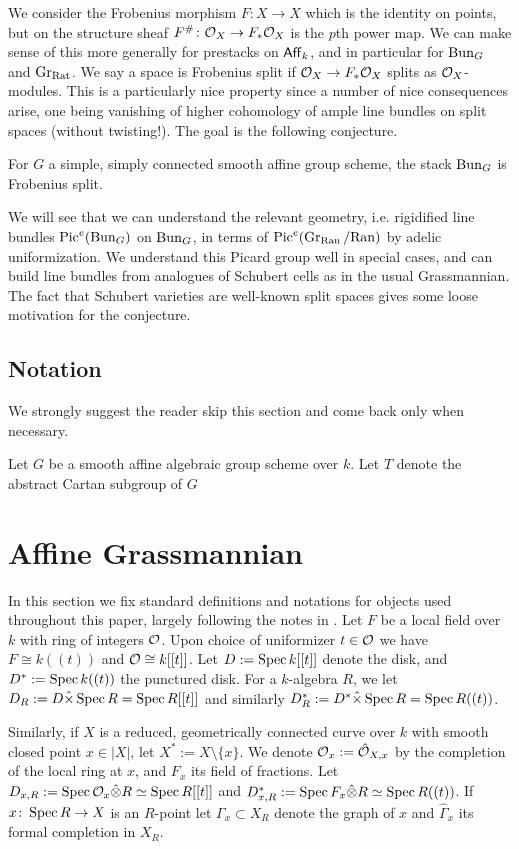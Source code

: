 \documentclass[12pt]{article}
\begin{document}
We consider the Frobenius morphism $F \colon X \to X$ which is the identity on points, but on the structure sheaf $F^{\#}\colon \mathcal{O}_X \to F_* \mathcal{O}_X$ is the $p$th power map. We can make sense of this more generally for prestacks on $\operatorname{\mathsf{Aff}}_k$, and in particular for $\operatorname{Bun}_G$ and $\operatorname{Gr}_{\mathrm{Rat}}$. We say a space is Frobenius split if $\mathcal{O}_X \to F_* \mathcal{O}_X$ splits as $\mathcal{O}_X$-modules. This is a particularly nice property since a number of nice consequences arise, one being vanishing of higher cohomology of ample line bundles on split spaces (without twisting!). The goal is the following conjecture.
\begin{conj}
    For $G$ a simple, simply connected smooth affine group scheme, the stack $\operatorname{Bun}_G$ is Frobenius split.
\end{conj}
We will see that we can understand the relevant geometry, i.e. rigidified line bundles $\operatorname{Pic}^e(\operatorname{Bun}_G)$ on $\operatorname{Bun}_G$, in terms of $\operatorname{Pic}^e(\operatorname{Gr}_{\mathrm{Ran}}/\mathrm{Ran})$ by adelic uniformization. We understand this Picard group well in special cases, and can build line bundles from analogues of Schubert cells as in the usual Grassmannian. The fact that Schubert varieties are well-known split spaces gives some loose motivation for the conjecture.

\subsection{Notation}

We strongly suggest the reader skip this section and come back only when necessary.

Let $G$ be a smooth affine algebraic group scheme over $k$. Let $T$ denote the abstract Cartan subgroup of $G$



\section{Affine Grassmannian}
In this section we fix standard definitions and notations for objects used throughout this paper, largely following the notes in \cite{zhu}. Let $F$ be a local field over $k$ with ring of integers $\mathcal{O}$. Upon choice of uniformizer $t \in \mathcal{O}$ we have $F \cong k((t))$ and $\mathcal{O} \cong k[[t]]$. Let $D := \operatorname{Spec} k[[t]]$ denote the disk, and $D^* := \operatorname{Spec} k((t))$ the punctured disk. For a $k$-algebra $R$, we let $D_R := D \hat{\times} \operatorname{Spec} R = \operatorname{Spec} R[[t]]$ and similarly $D^*_R := D^* \hat{\times} \operatorname{Spec} R = \operatorname{Spec} R((t))$. 

Similarly, if $X$ is a reduced, geometrically connected curve over $k$ with smooth closed point $x \in |X|$, let $X^* := X \setminus \{x\}$. We denote $\mathcal{O}_x := \hat{\mathcal{O}}_{X,x}$ by the completion of the local ring at $x$, and $F_x$ its field of fractions. Let $D_{x,R} := \operatorname{Spec} \mathcal{O}_x \hat{\otimes} R \simeq \operatorname{Spec} R[[t]]$ and $D_{x,R}^* := \operatorname{Spec} F_x \hat{\otimes} R \simeq \operatorname{Spec} R((t))$. If $x \colon \operatorname{Spec} R \to X$ is an $R$-point let $\Gamma_x \subset X_R$ denote the graph of $x$ and $\hat{\Gamma}_x$ its formal completion in $X_R$.
\end{document}

